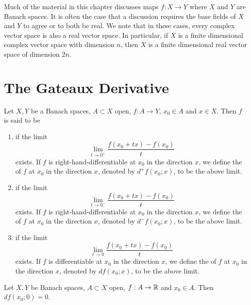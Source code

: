 \documentclass{book}
\begin{document}
	\newpage
	\begin{note}
		Much of the material in this chapter discusses maps $f: X \rightarrow Y$ where $X$ and $Y$ are Banach spaces. It is often the case that a discussion requires the base fields of $X$ and $Y$ to agree or to both be real. We note that in these cases, every complex vector space is also a real vector space. In particular, if $X$ is a finite dimensional complex vector space with dimension $n$, then $X$ is a finite dimensional real vector space of dimension $2n$.
	\end{note}
	
	\section{The Gateaux Derivative}
	
	\begin{defn} 
	Let $X,Y$ be a Banach spaces, $A \subset X$ open, $f:A \rightarrow Y$, $x_0 \in A$ and $x \in X$. Then $f$ is said to be 
	\begin{enumerate}
	\item {} if the limit
	$$  \lim_{t \rightarrow 0^+} \frac{f(x_0 +tx) - f(x_0)}{t}$$
	exists. If $f$ is right-hand-differentiable at $x_0$ in the direction $x$, we define the  of $f$ at $x_0$ in the direction $x$, denoted by  $d^+ f(x_0; x)$, to be the above limit. 
	
	\item {} if the limit
	$$  \lim_{t \rightarrow 0^-} \frac{f(x_0 +tx) - f(x_0)}{t}$$
	exists. If $f$ is right-hand-differentiable at $x_0$ in the direction $x$, we define the  of $f$ at $x_0$ in the direction $x$, denoted by  $d^- f(x_0; x)$, to be the above limit. 
	
	\item {} if the limit
	$$  \lim_{t \rightarrow 0} \frac{f(x_0 +tx) - f(x_0)}{t}$$
	exists. If $f$ is differentiable at $x_0$ in the direction $x$, we define the  of $f$ at $x_0$ in the direction $x$, denoted by $d f(x_0; x)$, to be the above limit. 
	\end{enumerate}
	\end{defn}	
	
	\begin{ex} 
	Let $X, Y$ be Banach spaces, $A \subset X$ open, $f:A \rightarrow \mathbb{R}$ and $x_0 \in A$. Then $df(x_0; 0) = 0$.
	\end{ex}
	
\end{document}
